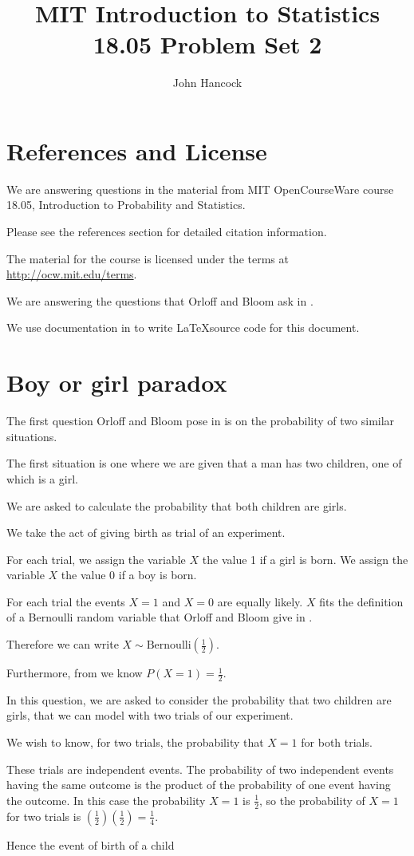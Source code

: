 \documentclass[a4paper,11pt]{article}
\author{John Hancock}
\title{MIT Introduction to Statistics 18.05 Problem Set 2 }
\begin{document}
\maketitle
\tableofcontents
\section{References and License}
We are answering questions in the material from MIT OpenCourseWare
course 18.05, Introduction to Probability and Statistics.

Please see the references section for detailed citation information.

The material for the course is licensed under the terms at 
\url{http://ocw.mit.edu/terms}.

We are answering the questions that Orloff and Bloom ask in
\cite{probSet2}.

We use documentation in  to write \LaTeX source code
for this document.

\section{Boy or girl paradox}
The first question Orloff and Bloom pose in \cite{probSet2} is
on the probability of two similar situations.

The first situation is one where we are given that a man has
two children, one of which is a girl.

We are asked to calculate the probability that both children
are girls.

We take the act of giving birth as trial of an 
experiment.

For each trial, we assign the variable $X$ the value 1 if a girl is
born. We assign the variable $X$ the value 0 if a
boy is born.

For each trial the events $X =1$ and $X = 0$ are
equally likely. $X$ fits the definition of a Bernoulli
random variable that Orloff and Bloom give in \cite{reading4}.

Therefore we can write $X \sim \text{Bernoulli} \left( \frac{1}{2} \right)$.

Furthermore, from \cite{reading4} we know $P\left( X = 1 \right) = \frac{1}{2}$.

In this question, we are asked to consider the
probability that two children are girls, that we
can model with two trials of our experiment.

We wish to know, for two trials, the probability
that $X=1$ for both trials.

These trials are independent events. The
probability of two independent events having the same
outcome is the product of the probability
of one event having the outcome.  In this case
the probability $X=1$ is $\frac{1}{2}$, so the
probability of $X=1$ for two trials is 
$\left( \frac{1}{2} \right) \left( \frac{1}{2} \right) = \frac{1}{4}$.


Hence the event of birth of a child 
\printbibliography{}
\end{document}
